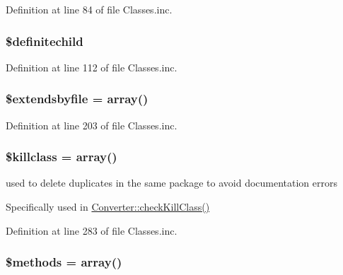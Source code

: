 \-Definition at line 84 of file \-Classes.\-inc.

\hypertarget{class_classes_a3bfcd7033b3a72a42d39b10adf37c69b}{
\subsubsection[{\$definitechild}]{\setlength{\rightskip}{0pt plus 5cm}\$definitechild}}\label{class_classes_a3bfcd7033b3a72a42d39b10adf37c69b}


\-Definition at line 112 of file \-Classes.\-inc.

\hypertarget{class_classes_abcf0059662798e569d59c2c18a217a2e}{
\subsubsection[{\$extendsbyfile}]{\setlength{\rightskip}{0pt plus 5cm}\$extendsbyfile = array()}}\label{class_classes_abcf0059662798e569d59c2c18a217a2e}


\-Definition at line 203 of file \-Classes.\-inc.

\hypertarget{class_classes_a67455ac1c751cd5e5b977f7153c037fa}{
\subsubsection[{\$killclass}]{\setlength{\rightskip}{0pt plus 5cm}\$killclass = array()}}\label{class_classes_a67455ac1c751cd5e5b977f7153c037fa}
used to delete duplicates in the same package to avoid documentation errors

\-Specifically used in \hyperlink{class_converter_aa8ac49bca3549ebe7ed50e144f4596b0}{\-Converter\-::check\-Kill\-Class()} 

\-Definition at line 283 of file \-Classes.\-inc.

\hypertarget{class_classes_a802753499268a04da139bd6e6ef89b35}{
\subsubsection[{\$methods}]{\setlength{\rightskip}{0pt plus 5cm}\$methods = array()}}\label{class_classes_a802753499268a04da139bd6e6ef89b35}


